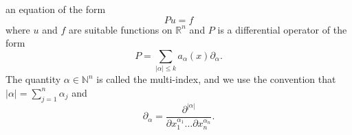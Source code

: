  an equation of the form
 \[Pu=f \] where  $ u $  and  $ f $  are suitable functions on  $  \mathbb{R}^n $  and  $ P $ 
is a  differential operator of the form
 \[P= \sum_{| \alpha | \leq k} a_ \alpha (x) \partial_ \alpha.  \]
The quantity  $  \alpha  \in  \mathbb{N}^n $  is called the  multi-index, and
we use the convention that  $ | \alpha |= \sum_{j=1}^n  \alpha _j $  and
 \[ \partial_ \alpha = \frac{ \partial^{| \alpha |}}{ \partial x_1^{ \alpha
_1} \ldots \partial x_n^{ \alpha _n}}. \]


